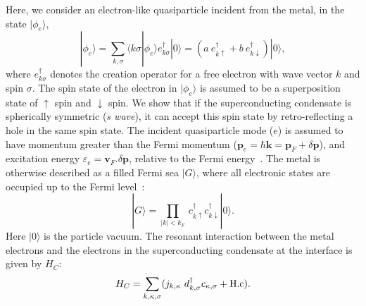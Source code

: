 \documentclass[10pt,letterpaper,aps,onecolumn,superscriptaddress,floatfix,notitlepage]{revtex4-1}
\begin{document}
	Here, we consider an electron-like quasiparticle incident from the metal, in the state $|\phi_{e}\rangle$, 
	\begin{equation}|\phi_{e}\rangle =\sum\limits_{k,\sigma}\langle k\sigma|\phi_{e}\rangle e_{k\sigma}^{\dagger}|0\rangle =  (a~e^{\dagger}_{k\uparrow}+b~e^{\dagger}_{k\downarrow})|0\rangle,\end{equation} 
	where $e^{\dagger}_{k\sigma}$ denotes the creation operator for a free electron with wave vector $k$ and spin $\sigma$. The	spin state of the electron in $|\phi_{e}\rangle$ is assumed to be a superposition state of $\uparrow$ spin and $\downarrow$ spin.
	We show that if the superconducting condensate is spherically symmetric (\textit{s wave}), it can accept this spin state by retro-reflecting a hole in the same spin state. The incident quasiparticle mode ($e$) is assumed to have momentum greater than the Fermi momentum ($	\textbf{p}_{e} = \hbar \textbf{k} = \textbf{p}_{F}+\delta \textbf{p}$), and excitation energy $\varepsilon_{e} = \textbf{v}_{F}.\delta\textbf{p}$, relative to the Fermi energy~\cite{spintron}.
	The metal is otherwise described as a filled Fermi sea $|G\rangle$, where all electronic states are occupied up to the Fermi level~\cite{mahan}:
	\begin{equation}
	|G\rangle = \prod_{|k|<k_{F}}~c_{k\uparrow}^{\dagger}c_{k\downarrow}^{\dagger}|0\rangle.\end{equation}
	Here $|0\rangle$ is the particle vacuum.  The resonant interaction between the metal electrons and the electrons in the superconducting condensate at the interface is given by $H_{C}$:
	\begin{equation} 
	H_{C} = \sum\limits_{k,\kappa,\sigma}(j_{k,\kappa}~d_{k,\sigma}^{\dagger}c_{\kappa,\sigma}+\rm{H.c}).\end{equation} 
\end{document}
